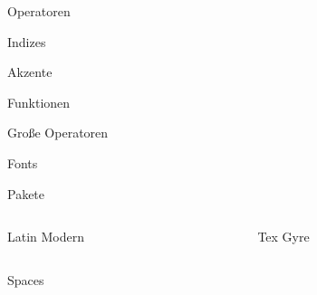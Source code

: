 \begin{frame}{Operatoren}
\end{frame}

\begin{frame}{Indizes}
\end{frame}

\begin{frame}{Akzente}
\end{frame}

\begin{frame}{Funktionen}
\end{frame}

\begin{frame}{Große Operatoren}
\end{frame}

\begin{frame}[fragile]{Fonts}
    \begin{block}{Pakete}
        \begin{lstverbatim}
        \usepackage{unicode-math} %
        \end{lstverbatim}
    \end{block}
    \begin{columns}[t]
        \begin{column}{0.47\textwidth}
            \begin{block}{Latin Modern}
                \begin{lstverbatim}
                \end{lstverbatim}
            \end{block}
        \end{column}
        \begin{column}{0.47\textwidth}
            \begin{block}{Tex Gyre}
                \begin{lstverbatim}
                \end{lstverbatim}
            \end{block}
        \end{column}
    \end{columns}
\end{frame}

\begin{frame}{Spaces}
\end{frame}

